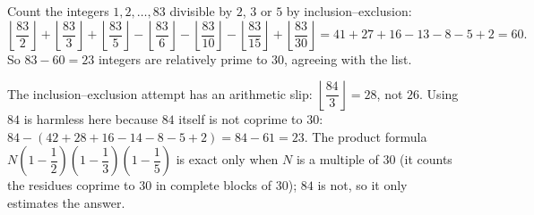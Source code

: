Count the integers \(1,2,\dots,83\) divisible by \(2\), \(3\) or \(5\) by inclusion--exclusion:
\[
\left\lfloor\dfrac{83}{2}\right\rfloor+\left\lfloor\dfrac{83}{3}\right\rfloor+\left\lfloor\dfrac{83}{5}\right\rfloor-\left\lfloor\dfrac{83}{6}\right\rfloor-\left\lfloor\dfrac{83}{10}\right\rfloor-\left\lfloor\dfrac{83}{15}\right\rfloor+\left\lfloor\dfrac{83}{30}\right\rfloor=41+27+16-13-8-5+2=60.
\]
So \(83-60=\boxed{23}\) integers are relatively prime to \(30\), agreeing with the list.

The inclusion--exclusion attempt has an arithmetic slip: \(\left\lfloor\dfrac{84}{3}\right\rfloor=28\), not \(26\). Using \(84\) is harmless here because \(84\) itself is not coprime to \(30\): \(84-(42+28+16-14-8-5+2)=84-61=23\). The product formula \(N\left(1-\dfrac{1}{2}\right)\left(1-\dfrac{1}{3}\right)\left(1-\dfrac{1}{5}\right)\) is exact only when \(N\) is a multiple of \(30\) (it counts the residues coprime to \(30\) in complete blocks of \(30\)); \(84\) is not, so it only estimates the answer.
